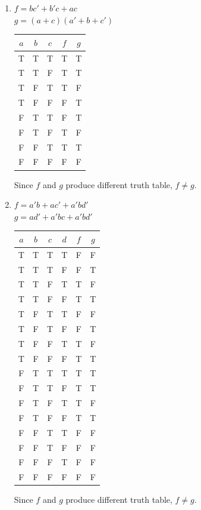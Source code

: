 \documentclass{homework}
\begin{document}

\begin{enumerate}
\item $f = bc' + b'c + ac$ \\ $g = (a + c)(a' + b + c')$

\begin{tabular}{ccc|cc}
$a$ & $b$ & $c$ & $f$ & $g$ \\
\hline
T & T & T & T & T \\
T & T & F & T & T \\
T & F & T & T & F \\
T & F & F & F & T \\
F & T & T & F & T \\
F & T & F & T & F \\
F & F & T & T & T \\
F & F & F & F & F \\
\end{tabular}

Since $f$ and $g$ produce different truth table, $f \neq g$.

\item $f = a'b + ac' + a'bd'$ \\ $g = ad' + a'bc + a'bd'$

\begin{tabular}{cccc|cc}
$a$ & $b$ & $c$ & $d$ & $f$ & $g$ \\
\hline
T & T & T & T & F & F \\
T & T & T & F & F & T \\
T & T & F & T & T & F \\
T & T & F & F & T & T \\
T & F & T & T & F & F \\
T & F & T & F & F & T \\
T & F & F & T & T & F \\
T & F & F & F & T & T \\
F & T & T & T & T & T \\
F & T & T & F & T & T \\
F & T & F & T & T & F \\
F & T & F & F & T & T \\
F & F & T & T & F & F \\
F & F & T & F & F & F \\
F & F & F & T & F & F \\
F & F & F & F & F & F \\
\end{tabular}

Since $f$ and $g$ produce different truth table, $f \neq g$.

\end{enumerate}
\end{document}
